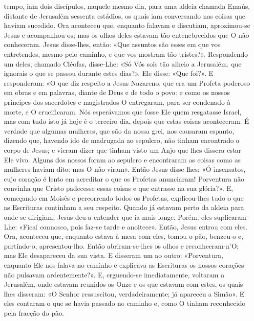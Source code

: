 \begin{paracol}{2}
{ tempo, iam dois discípulos, naquele mesmo dia, para uma aldeia chamada Emaús, distante de Jerusalém sessenta estádios, os quais iam conversando nas coisas que haviam sucedido. Ora aconteceu que, enquanto falavam e discutiam, aproximou-se Jesus e acompanhou-os; mas os olhos deles estavam tão entenebrecidos que O não conheceram. Jesus disse-lhes, então: «Que assuntos são esses em que vos entretendes, mesmo pelo caminho, e que vos mostram tão tristes?». Respondendo um deles, chamado Cléofas, disse-Lhe: «Só Vós sois tão alheio a Jerusalém, que ignorais o que se passou durante estes dias?». Ele disse: «Que foi?». E responderam: «O que diz respeito a Jesus Nazareno, que era um Profeta poderoso em obras e em palavras, diante de Deus e de todo o povo: e como os nossos príncipes dos sacerdotes e magistrados O entregaram, para ser condenado à morte, e O crucificaram. Nós esperávamos que fosse Ele quem resgatasse Israel, mas com tudo isto já hoje é o terceiro dia, depois que estas coisas aconteceram. É verdade que algumas mulheres, que são da nossa grei, nos causaram espanto, dizendo que, havendo ido de madrugada ao sepulcro, não tinham encontrado o corpo de Jesus; e vieram dizer que tinham visto um Anjo que lhes dissera estar Ele vivo. Alguns dos nossos foram ao sepulcro e encontraram as coisas como as mulheres haviam dito: mas O não viram». Então Jesus disse-lhes: «Ó insensatos, cujo coração é lento em acreditar o que os Profetas anunciaram! Porventura não convinha que Cristo padecesse essas coisas e que entrasse na sua glória?». E, começando em Moisés e percorrendo todos os Profetas, explicou-lhes tudo o que as Escrituras continham a seu respeito. Quando já estavam perto da aldeia para onde se dirigiam, Jesus deu a entender que ia mais longe. Porém, eles suplicaram-Lhe: «Ficai connosco, pois faz-se tarde e anoitece». Então, Jesus entrou com eles. Ora, aconteceu que, enquanto estava à mesa com eles, tomou o pão, benzeu-o e, partindo-o, apresentou-lho. Então abriram-se-lhes os olhos e reconhceram-n’O: mas Ele desapareceu da sua vista. E disseram um ao outro: «Porventura, enquanto Ele nos falava no caminho e explicava as Escrituras os nossos corações não pulsavam ardentemente?». E, erguendo-se imediatamente, voltaram a Jerusalém, onde estavam reunidos os Onze e os que estavam com estes, os quais lhes disseram: «O Senhor ressuscitou, verdadeiramente; já apareceu a Simão». E eles contaram o que se havia passado no caminho e, como O tinham reconhecido pela fracção do pão.
}\end{paracol}

